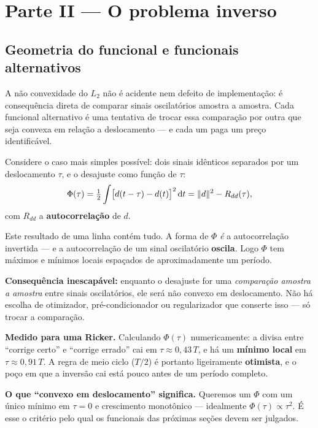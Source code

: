 \documentclass[11pt,a4paper,oneside]{report}
\begin{document}
\part*{\centering\color{azulfwi} Parte II --- O problema inverso}

\chapter{Geometria do funcional e funcionais alternativos}
\label{cap:misfit}

\begin{ideia}
A n\~ao convexidade do $L_2$ n\~ao \'e acidente nem defeito de
implementa\c{c}\~ao: \'e consequ\^encia direta de comparar sinais
oscilat\'orios amostra a amostra. Cada funcional alternativo \'e uma tentativa
de trocar essa compara\c{c}\~ao por outra que seja convexa em rela\c{c}\~ao a
deslocamento --- e cada um paga um pre\c{c}o identific\'avel.
\end{ideia}

\begin{matematica}
Considere o caso mais simples poss\'ivel: dois sinais id\^enticos separados por
um deslocamento $\tau$, e o desajuste como fun\c{c}\~ao de $\tau$:
\[
\Phi(\tau) = \tfrac12\int \bigl[d(t-\tau) - d(t)\bigr]^{2}\,\mathrm{d} t
 = \lVert d \rVert^{2} - R_{dd}(\tau),
\]
com $R_{dd}$ a \textbf{autocorrela\c{c}\~ao} de $d$.

Este resultado de uma linha cont\'em tudo. A forma de $\Phi$ \emph{\'e} a
autocorrela\c{c}\~ao invertida --- e a autocorrela\c{c}\~ao de um sinal
oscilat\'orio \textbf{oscila}. Logo $\Phi$ tem m\'aximos e m\'inimos locais
espa\c{c}ados de aproximadamente um per\'iodo.

\textbf{Consequ\^encia inescap\'avel:} enquanto o desajuste for uma
\emph{compara\c{c}\~ao amostra a amostra} entre sinais oscilat\'orios, ele
ser\'a n\~ao convexo em deslocamento. N\~ao h\'a escolha de otimizador,
pr\'e-condicionador ou regularizador que conserte isso --- s\'o trocar a
compara\c{c}\~ao.

\textbf{Medido para uma Ricker.} Calculando $\Phi(\tau)$ numericamente: a
divisa entre ``corrige certo'' e ``corrige errado'' cai em
$\tau \approx 0{,}43\,T$, e h\'a um \textbf{m\'inimo local} em
$\tau \approx 0{,}91\,T$. A regra de meio ciclo ($T/2$) \'e portanto
ligeiramente \textbf{otimista}, e o po\c{c}o em que a invers\~ao cai est\'a
pouco antes de um per\'iodo completo.

\textbf{O que ``convexo em deslocamento'' significa.} Queremos um $\Phi$ com
um \'unico m\'inimo em $\tau = 0$ e crescimento monot\^onico --- idealmente
$\Phi(\tau)\propto\tau^{2}$. \'E esse o crit\'erio pelo qual os funcionais das
pr\'oximas se\c{c}\~oes devem ser julgados.
\end{matematica}
\end{document}
